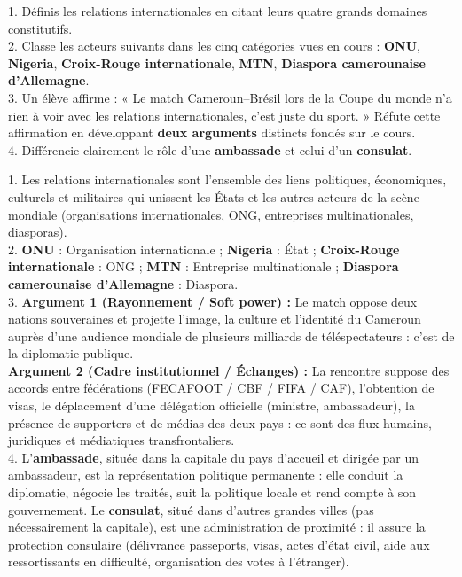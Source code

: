 \documentclass[11pt]{article}
\newcommand{\cle}[1]{{\popxbold\color{popdark}#1}}
\begin{document}
\begin{exercice}
1. Définis les relations internationales en citant leurs quatre grands domaines constitutifs.\\
2. Classe les acteurs suivants dans les cinq catégories vues en cours : \textbf{ONU}, \textbf{Nigeria}, \textbf{Croix-Rouge internationale}, \textbf{MTN}, \textbf{Diaspora camerounaise d'Allemagne}.\\
3. Un élève affirme : « Le match Cameroun--Brésil lors de la Coupe du monde n'a rien à voir avec les relations internationales, c'est juste du sport. » Réfute cette affirmation en développant \textbf{deux arguments} distincts fondés sur le cours.\\
4. Différencie clairement le rôle d'une \textbf{ambassade} et celui d'un \textbf{consulat}.
\end{exercice}

\begin{corrige}[Exercice 1]
1. Les relations internationales sont l'ensemble des liens \cle{politiques}, \cle{économiques}, \cle{culturels} et \cle{militaires} qui unissent les \cle{États} et les autres \cle{acteurs de la scène mondiale} (organisations internationales, ONG, entreprises multinationales, diasporas).\\
2. \textbf{ONU} : Organisation internationale ; \textbf{Nigeria} : État ; \textbf{Croix-Rouge internationale} : ONG ; \textbf{MTN} : Entreprise multinationale ; \textbf{Diaspora camerounaise d'Allemagne} : Diaspora.\\
3. \textbf{Argument 1 (Rayonnement / Soft power) :} Le match oppose deux nations souveraines et projette l'image, la culture et l'identité du Cameroun auprès d'une audience mondiale de plusieurs milliards de téléspectateurs : c'est de la diplomatie publique.\\
   \textbf{Argument 2 (Cadre institutionnel / Échanges) :} La rencontre suppose des accords entre fédérations (FECAFOOT / CBF / FIFA / CAF), l'obtention de visas, le déplacement d'une délégation officielle (ministre, ambassadeur), la présence de supporters et de médias des deux pays : ce sont des flux humains, juridiques et médiatiques transfrontaliers.\\
4. L'\textbf{ambassade}, située dans la \cle{capitale} du pays d'accueil et dirigée par un \cle{ambassadeur}, est la représentation politique permanente : elle conduit la diplomatie, négocie les traités, suit la politique locale et rend compte à son gouvernement. Le \textbf{consulat}, situé dans d'autres \cle{grandes villes} (pas nécessairement la capitale), est une administration de proximité : il assure la \cle{protection consulaire} (délivrance passeports, visas, actes d'état civil, aide aux ressortissants en difficulté, organisation des votes à l'étranger).
\end{corrige}
\end{document}
